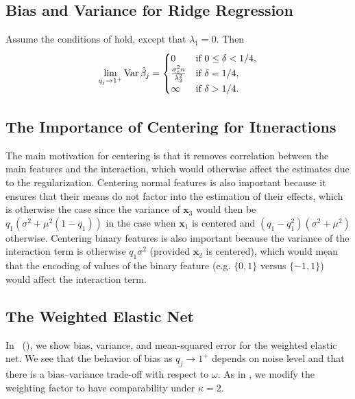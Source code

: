 \subsection{Bias and Variance for Ridge Regression}%
\label{sec:ridge-variance}

\begin{corollary}
  \label{cor:ridge-variance}
  Assume the conditions of  hold, except that
  \(\lambda_1 = 0\). Then
  \[
    \lim_{q_j \rightarrow 1^+} \operatorname{Var} \hat{\beta}_j =
    \begin{cases}
      0                                          & \text{if } 0 \leq \delta < 1/4, \\
      \frac{\sigma_\varepsilon^2 n}{\lambda_2^2} & \text{if } \delta = 1/4,        \\
      \infty                                     & \text{if } \delta > 1/4.
    \end{cases}
  \]
\end{corollary}

\subsection{The Importance of Centering for Itneractions}%
\label{sec:centering-interactions}

The main motivation for centering is that it removes correlation between the main features
and the interaction, which would otherwise affect the estimates due to the regularization.
Centering normal features is also important because it ensures that their means do not
factor into the estimation of their effects, which is otherwise the case since the variance
of \(\bm{x}_3\) would then be \(q_1(\sigma^2 + \mu^2(1 - q_1))\) in the case when
\(\bm{x}_1\) is centered and \((q_1 - q_1^2)(\sigma^2 + \mu^2)\) otherwise. Centering
binary features is also important because the variance of the interaction term is otherwise
\(q_1\sigma^2\) (provided \(\bm{x}_2\) is centered), which would mean that the encoding of
values of the binary feature (e.g. \(\{0,1\}\) versus \(\{-1, 1\}\)) would affect the
interaction term.

\subsection{The Weighted Elastic Net}%
\label{sec:additional-theory-weighted-elnet}

In ~(),
we show bias, variance, and mean-squared error for the weighted elastic net. We see that
the behavior of bias as \(q_j \rightarrow 1^+\) depends on noise level and that there is a
bias--variance trade-off with respect to \(\omega\). As in , we modify
the weighting factor to have comparability under \(\kappa = 2\).

